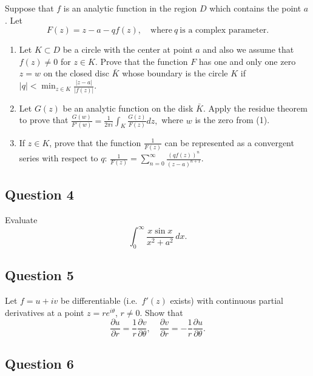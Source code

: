 \documentclass[12pt]{article}
\begin{document}
Suppose that \(f\) is an analytic function in the region \(D\) which
contains the point \(a\). Let
\[F(z)= z-a-qf(z),\quad \text{where}~ q \ \text{is a complex
parameter}.\]

\begin{enumerate}
\def\labelenumi{(\arabic{enumi})}
\item
  Let \(K\subset D\) be a circle with the center at point \(a\) and also
  we assume that \(f(z)\not =0\) for \(z\in K\). Prove that the function
  \(F\) has one and only one zero \(z=w\) on the closed disc \(\bar{K}\)
  whose boundary is the circle \(K\) if
  \(\displaystyle{ |q|<\min_{z\in K} \frac{|z-a|}{|f(z)|}.}\)\\
\item
  Let \(G(z)\) be an analytic function on the disk \(\bar{K}\). Apply
  the residue theorem to prove that
  \(\displaystyle{ \frac{G(w)}{F'(w)}=\frac{1}{2\pi i}\int_K \frac{G(z)}{F(z)} dz,}\)
  where \(w\) is the zero from (1).\\
\item
  If \(z\in K\), prove that the function
  \(\displaystyle{\frac{1}{F(z)}}\) can be represented as a convergent
  series with respect to \(q\):
  \(\displaystyle{ \frac{1}{F(z)}=\sum_{n=0}^{\infty} \frac{(qf(z))^n}{(z-a)^{n+1}}.}\)
\end{enumerate}

\hypertarget{question-4-2}{%
\subsection{Question 4}\label{question-4-2}}

Evaluate \[\displaystyle{ \int_{0}^{\infty}\frac{x\sin x}{x^2+a^2} \,
dx }.\]

\hypertarget{question-5-2}{%
\subsection{Question 5}\label{question-5-2}}

Let \(f=u+iv\) be differentiable (i.e.~\(f'(z)\) exists) with continuous
partial derivatives at a point \(z=re^{i\theta}\), \(r\not= 0\). Show
that
\[\frac{\partial u}{\partial r}=\frac{1}{r}\frac{\partial v}{\partial \theta},\quad
\frac{\partial v}{\partial r}=-\frac{1}{r}\frac{\partial u}{\partial \theta}.\]

\hypertarget{question-6-2}{%
\subsection{Question 6}\label{question-6-2}}
\end{document}
